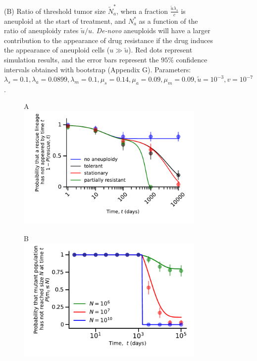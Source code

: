 \documentclass[12pt]{extarticle}
\begin{document}
\begin{figure}
{(B) Ratio of threshold tumor size $\tilde{N}_a^*$, when a fraction $\frac{\tilde{u}\lambda_s}{c}$ is aneuploid at the start of treatment, and $N_a^*$ as a function of the ratio of aneuploidy rates $\tilde{u}/u$. \emph{De-novo} aneuploids will have a larger contribution to the appearance of drug resistance if the drug induces the appearance of aneuploid cells ($u \gg \tilde u$). Red dots represent simulation results, and the error bars represent the $95\%$ confidence intervals obtained with bootstrap (Appendix G). Parameters: $\lambda_s=0.1,\lambda_a=0.0899,\lambda_m=0.1,\mu_s=0.14,\mu_a=0.09,\mu_m=0.09,\tilde{u}=10^{-3}, v=10^{-7}$.
}
\label{rescue_denovo}
\end{figure}


\begin{figure}
\vspace*{1\baselineskip}
\begin{subfigure}{0.5\textwidth}
A\\
\includegraphics[width=1\textwidth]{Figures/ReboundProbability.pdf}
\end{subfigure}
\begin{subfigure}{0.5\textwidth}
B\\
\includegraphics[width=1\textwidth]{Figures/ProliferationTimeCDFN.pdf}

\end{subfigure}
\end{figure}
\end{document}
